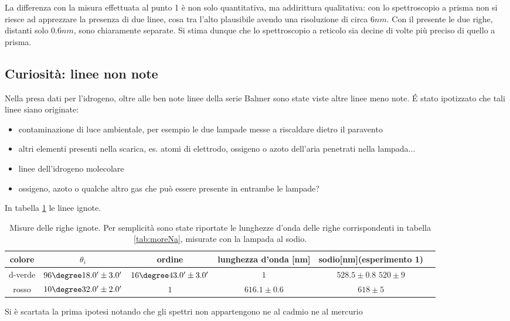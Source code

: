 \documentclass[a4paper,10pt]{article}
\begin{document}
{{{{{{{{La differenza con la misura effettuata al punto 1 è non solo quantitativa, ma addirittura qualitativa: con lo spettroscopio a prisma non si riesce ad apprezzare la presenza di due linee, cosa tra l'alto plausibile avendo una risoluzione di circa $6 nm$. Con il presente le due righe, distanti solo $0.6 nm$, sono chiaramente separate. Si stima dunque che lo spettroscopio a reticolo sia decine di volte più preciso di quello a prisma.  




\subsection{Curiosità: linee non note}
Nella presa dati per l'idrogeno, oltre alle ben note linee della serie Balmer sono state viste altre linee meno note. \'E stato ipotizzato che tali linee siano originate:
\begin{itemize}
\item contaminazione di luce ambientale, per esempio le due lampade messe a riscaldare dietro il paravento
\item altri elementi presenti nella scarica, es. atomi di elettrodo, ossigeno o azoto dell'aria penetrati nella lampada...
\item linee dell'idrogeno molecolare
\item ossigeno, azoto o qualche altro gas che può essere presente in entrambe le lampade? 
\end{itemize}

In tabella \ref{tab:Cur} le linee ignote.


\begin{table}[H]
\centering
\begin{tabular}{c|c|c|c|c|c}
colore & $\theta_i$ & ordine & lunghezza d'onda [nm] & sodio[nm](esperimento 1) \\
\hline
d-verde &  $ 96\degree 18.0' \pm 3.0 ' $  &  $ 16\degree 43.0' \pm 3.0 ' $  &  $ 1 $ & $ 528.5 \pm 0.8 $ $520 \pm 9$\\
rosso &    $ 10\degree 32.0' \pm 2.0 ' $  &  $ 1 $ & $ 616.1 \pm 0.6 $ & $ 618 \pm 5 $\\
\end{tabular}
\caption{Misure delle righe ignote. Per semplicità sono state riportate le lunghezze d'onda delle righe corrispondenti in tabella \ref{tab:moreNa}, misurate con la lampada al sodio.}
\label{tab:Cur}
\end{table}

Si è scartata la prima ipotesi notando che gli spettri non appartengono ne al cadmio ne al mercurio\\


}}}}}}}}
\end{document}
